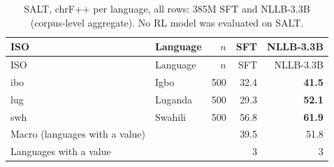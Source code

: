{\footnotesize\setlength{\tabcolsep}{3pt}
\begin{longtable}{@{}llrrr@{}}
\caption{SALT, chrF++ per language, all rows: 385M SFT and NLLB-3.3B (corpus-level aggregate). No RL model was evaluated on SALT.}\label{tab:full-salt-chrfpp}\\
\toprule
ISO & Language & $n$ & SFT & NLLB-3.3B \\
\midrule\endfirsthead
\toprule
ISO & Language & $n$ & SFT & NLLB-3.3B \\
\midrule\endhead
\midrule\endfoot
\bottomrule\endlastfoot
ibo & Igbo & 500 & 32.4 & \textbf{41.5} \\
lug & Luganda & 500 & 29.3 & \textbf{52.1} \\
swh & Swahili & 500 & 56.8 & \textbf{61.9} \\
\midrule
Macro (languages with a value) & & & 39.5 & 51.8 \\
Languages with a value & & & 3 & 3 \\
\end{longtable}}

